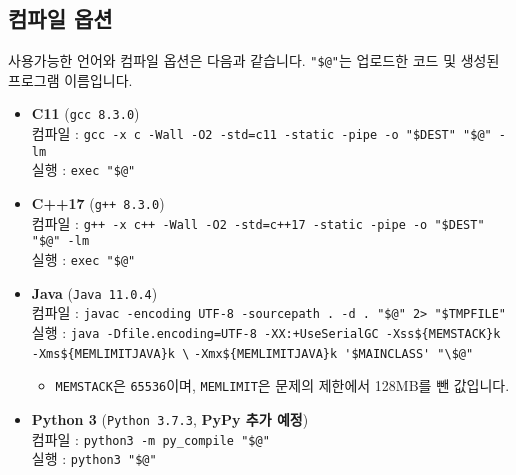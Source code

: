 \subsection*{컴파일 옵션}
사용가능한 언어와 컴파일 옵션은 다음과 같습니다. \verb|"$@"|는 업로드한 코드 및 생성된 프로그램 이름입니다.
\begin{itemize}
    \item \textbf{C11} (\texttt{gcc 8.3.0})\\
    컴파일 : \verb|gcc -x c -Wall -O2 -std=c11 -static -pipe -o "$DEST" "$@" -lm|\\
    실행 : \verb|exec "$@"|
    \item \textbf{C++17} (\texttt{g++ 8.3.0})\\
    컴파일 : \verb|g++ -x c++ -Wall -O2 -std=c++17 -static -pipe -o "$DEST" "$@" -lm|\\
    실행 : \verb|exec "$@"|
    \item \textbf{Java} (\texttt{Java 11.0.4})\\
    컴파일 : \verb|javac -encoding UTF-8 -sourcepath . -d . "$@" 2> "$TMPFILE"|\\
    실행 : \verb|java -Dfile.encoding=UTF-8 -XX:+UseSerialGC -Xss${MEMSTACK}k -Xms${MEMLIMITJAVA}k \|
    \verb|-Xmx${MEMLIMITJAVA}k '$MAINCLASS' "\$@"|
    \begin{itemize}
        \item \verb|MEMSTACK|은 \verb|65536|이며, \verb|MEMLIMIT|은 문제의 제한에서 128MB를 뺀 값입니다.
    \end{itemize}
    \item \textbf{Python 3} (\texttt{Python 3.7.3}, {\color{red}\textbf{PyPy 추가 예정}})\\
    컴파일 : \verb|python3 -m py_compile "$@"|\\
    실행 : \verb|python3 "$@"|
\end{itemize}